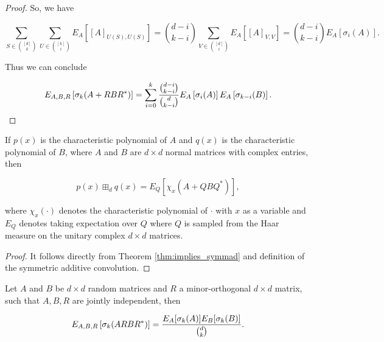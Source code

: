 \begin{proof}
    So, we have

    \begin{equation*}
        \sum_{S\in\binom{[d]}{k}} \sum_{U\in \binom{[k]}{i}}  E_A\left[ [A]_{U(S),U(S)} \right] = \binom{d-i}{k-i} \sum_{V\in \binom{[d]}{i}}  E_A\left[ [A]_{V,V} \right] = \binom{d-i}{k-i}E_A\left[\sigma_{i}(A)\right].
    \end{equation*}

    Thus we can conclude

    \begin{equation*}
        E_{A,B,R}\left[ \sigma_k(A + RBR^*) \right] =  \sum_{i=0}^k \frac{\binom{d-i}{k-i}}{\binom{d}{k-i}}E_{A} \left[\sigma_i(A)\right] E_{A}\left[\sigma_{k-i}(B)\right].
    \end{equation*}

\end{proof}


\begin{theorem} \label{thm:symmad}
    If $p(x)$ is the characteristic polynomial of $A$ and $q(x)$ is the characteristic polynomial of $B$, where $A$ and $B$ are $d\times d$ normal matrices with complex entries, then 

    \begin{equation*}
        p(x) \boxplus_d q(x) = E_Q\left[\chi_x(A + Q B Q^*)\right],
    \end{equation*}

    \noindent where $\chi_x(\cdot)$ denotes the characteristic polynomial of $\cdot$ with $x$ as a variable and $E_Q$ denotes taking expectation over $Q$ where $Q$ is sampled from the Haar measure on the unitary complex $d\times d$ matrices.
\end{theorem}

\begin{proof}
    It follows directly from Theorem \ref{thm:implies_symmad} and definition of the symmetric additive convolution.
\end{proof}


\begin{theorem} \label{thm:implies_symm_mult}
    Let $A$ and $B$ be $d\times d$ random matrices and $R$ a minor-orthogonal $d\times d$ matrix, such that $A,B,R$ are jointly independent, then

    \begin{equation*}
        E_{A,B,R} \left[\sigma_k(ARBR^*)\right] = \frac{E_A[\sigma_k(A)]E_B[\sigma_k(B)]}{\binom{d}{k}}.
    \end{equation*}
\end{theorem}

